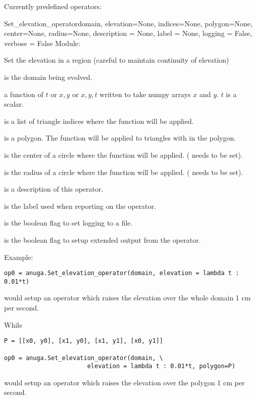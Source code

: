 \documentclass{manual}
\begin{document}
Currently predefined operators:


\begin{classdesc}{Set_elevation_operator}{domain,
                 elevation=None,
                 indices=None,
                 polygon=None,
                 center=None,
                 radius=None,
                 description = None,
                 label = None,
                 logging = False,
                 verbose = False}
Module: 

Set the elevation in a region (careful to maintain continuity of elevation)


 is the domain being evolved.

 a function of $t$ or $x,y$ or $x,y,t$ written to take numpy arrays $x$ and $y$. $t$ is a scalar.

 is a list of triangle indices where the function  will be applied.

 is a polygon. The function  will be applied to triangles with in the polygon.

 is the center of a circle where the function  will be applied. ( needs to be set).

 is the radius of a circle where the function  will be applied. ( needs to be set).

 is a description of this operator.

 is the label used when reporting on the operator.

 is the boolean flag to set logging to a file.

 is the boolean flag to setup extended output from the operator.

Example:

\begin{verbatim}
op0 = anuga.Set_elevation_operator(domain, elevation = lambda t : 0.01*t)
\end{verbatim}
would setup an operator which raises the elevation over the whole domain 1 cm per second.


While
\begin{verbatim}
P = [[x0, y0], [x1, y0], [x1, y1], [x0, y1]]

op0 = anuga.Set_elevation_operator(domain, \
                       elevation = lambda t : 0.01*t, polygon=P)
\end{verbatim}
would setup an operator which raises the elevation over the polygon  1 cm per second.

\end{classdesc}
\end{document}
